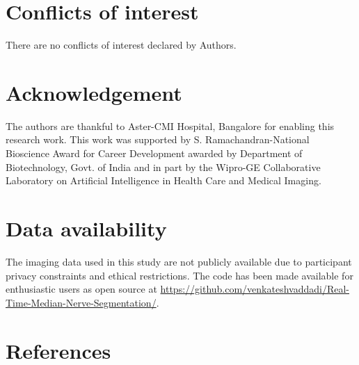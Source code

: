 \section*{Conflicts of interest}
There are no conflicts of interest declared by Authors.

\section*{Acknowledgement}
The authors are thankful to Aster-CMI Hospital, Bangalore for enabling this research work. This work was supported by S. Ramachandran-National Bioscience Award for Career Development awarded by Department of Biotechnology, Govt. of India and in part by the Wipro-GE Collaborative Laboratory on Artificial Intelligence in Health Care and Medical Imaging.

\section*{Data availability}
The imaging data used in this study are not publicly available due to participant privacy constraints and ethical restrictions. The code has been made available for enthusiastic users as open source at \href{https://github.com/venkateshvaddadi/Real-Time-Median-Nerve-Segmentation/}{https://github.com/venkateshvaddadi/Real-Time-Median-Nerve-Segmentation/}. 


\section*{References}
\vspace{-1.1cm}


\newpage

\listoftables
\listoffigures





